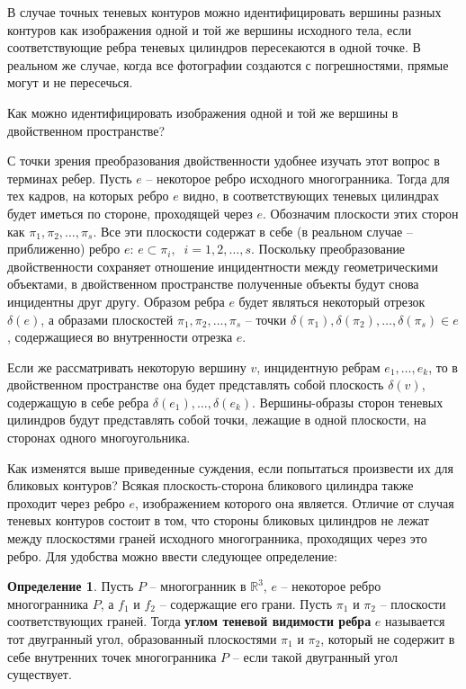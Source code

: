 \documentclass[a4paper, 12pt, titlepage]{article}
\theoremstyle{definition}
\newtheorem{SmartDefinition}{Определение}
\theoremstyle{plain}
\theoremstyle{plain}
\begin{document}

В случае точных теневых контуров можно идентифицировать вершины разных контуров
как изображения одной и той же вершины исходного тела, если соответствующие
ребра теневых цилиндров пересекаются в одной точке. В реальном же случае,
когда все фотографии создаются с погрешностями, прямые могут и не пересечься.

Как можно идентифицировать изображения одной и той же вершины в двойственном
пространстве?

С точки зрения преобразования двойственности удобнее изучать этот вопрос в
терминах ребер. Пусть $e$ -- некоторое ребро исходного многогранника. Тогда для
тех кадров, на которых ребро $e$ видно, в соответствующих теневых цилиндрах
будет иметься по стороне, проходящей через $e$. Обозначим плоскости этих
сторон как $\pi_{1}, \pi_{2}, \ldots, \pi_{s}$. Все эти плоскости содержат в
себе (в реальном случае -- приближенно) ребро $e$:
$e \subset \pi_{i}, \;\; i = 1, 2, \ldots, s$. Поскольку преобразование
двойственности сохраняет отношение инцидентности между геометрическими
объектами, в двойственном пространстве полученные объекты будут снова
инцидентны друг другу. Образом ребра $e$ будет являться некоторый отрезок
$\delta(e)$, а образами плоскостей $\pi_{1}, \pi_{2}, \ldots, \pi_{s}$ --
точки $\delta(\pi_{1}), \delta(\pi_{2}), \ldots, \delta(\pi_{s}) \in e$,
содержащиеся во внутренности отрезка $e$.

Если же рассматривать некоторую вершину $v$, инцидентную ребрам
$e_{1}, \ldots, e_{k}$, то в двойственном пространстве она будет представлять
собой плоскость $\delta(v)$, содержащую в себе ребра
$\delta(e_{1}), \ldots, \delta(e_{k})$. Вершины-образы сторон теневых цилиндров
будут представлять собой точки, лежащие в одной плоскости, на сторонах одного
многоугольника.

Как изменятся выше приведенные суждения, если попытаться произвести их для
бликовых контуров? Всякая плоскость-сторона бликового цилиндра также проходит
через ребро $e$, изображением которого она является. Отличие от случая теневых 
контуров состоит в том, что стороны бликовых цилиндров не лежат между
плоскостями граней исходного многогранника, проходящих через это ребро. Для 
удобства можно ввести следующее определение:

\begin{SmartDefinition}
 Пусть $P$ -- многогранник в $\mathbb{R}^{3}$, $e$ -- некоторое ребро
многогранника $P$, а $f_{1}$ и $f_{2}$ -- содержащие его грани. Пусть $\pi_{1}$
и $\pi_{2}$ -- плоскости соответствующих граней. Тогда \textbf{углом теневой
видимости ребра} $e$ называется тот двугранный угол, образованный плоскостями
$\pi_{1}$ и $\pi_{2}$, который не содержит в себе внутренних точек
многогранника $P$ -- если такой двугранный угол существует.
\end{SmartDefinition}
\end{document}
